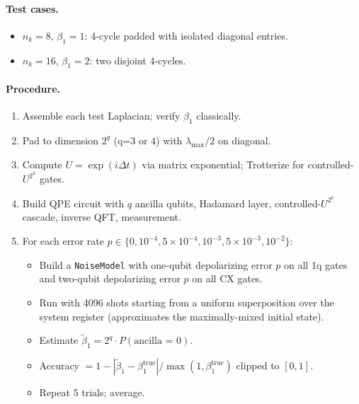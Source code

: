 \documentclass[11pt]{article}
\begin{document}
\paragraph*{Test cases.}
\begin{itemize}[leftmargin=*]
  \item $n_k = 8$, $\beta_1 = 1$: 4-cycle padded with isolated
        diagonal entries.
  \item $n_k = 16$, $\beta_1 = 2$: two disjoint 4-cycles.
\end{itemize}

\paragraph*{Procedure.}
\begin{enumerate}[leftmargin=*]
  \item Assemble each test Laplacian; verify $\beta_1$ classically.
  \item Pad to dimension $2^q$ (q=3 or 4) with
        $\lambda_{\max}/2$ on diagonal.
  \item Compute $U = \exp(i \Delta t)$ via matrix exponential;
        Trotterize for controlled-$U^{2^k}$ gates.
  \item Build QPE circuit with $q$ ancilla qubits, Hadamard layer,
        controlled-$U^{2^k}$ cascade, inverse QFT, measurement.
  \item For each error rate $p \in \{0, 10^{-4}, 5\times10^{-4},
        10^{-3}, 5\times10^{-3}, 10^{-2}\}$:
        \begin{itemize}
          \item Build a \texttt{NoiseModel} with one-qubit
                depolarizing error $p$ on all 1q gates and two-qubit
                depolarizing error $p$ on all CX gates.
          \item Run with 4096 shots starting from a uniform
                superposition over the system register (approximates
                the maximally-mixed initial state).
          \item Estimate $\tilde\beta_1 = 2^q \cdot P(\text{ancilla
                = }0)$.
          \item Accuracy $= 1 - |\tilde\beta_1 - \beta_1^{\text{true}}|
                / \max(1, \beta_1^{\text{true}})$ clipped to $[0,1]$.
          \item Repeat 5 trials; average.
        \end{itemize}
\end{enumerate}
\end{document}
